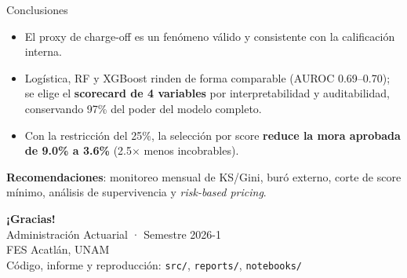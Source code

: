 \documentclass[aspectratio=169, 11pt]{beamer}
\newcommand{\bt}[1]{\textbf{#1}}
\begin{document}
\begin{frame}{Conclusiones}
  \begin{itemize}
    \item El proxy de charge-off es un fenómeno válido y consistente con la
          calificación interna.
    \item Logística, RF y XGBoost rinden de forma comparable (AUROC 0.69--0.70);
          se elige el \bt{scorecard de 4 variables} por interpretabilidad y
          auditabilidad, conservando 97\% del poder del modelo completo.
    \item Con la restricción del 25\%, la selección por score \bt{reduce la
          mora aprobada de 9.0\% a 3.6\%} (2.5$\times$ menos incobrables).
  \end{itemize}

  \vspace{0.5em}
  \bt{Recomendaciones}: monitoreo mensual de KS/Gini, buró externo,
  corte de score mínimo, análisis de supervivencia y \emph{risk-based
  pricing}.
\end{frame}

\begin{frame}[plain]
  \centering
  \vspace{1.5cm}
  {\Large\bfseries\color{azulunam} ¡Gracias!}\\[0.8cm]
  {\large Administración Actuarial · Semestre 2026-1}\\[0.3cm]
  FES Acatlán, UNAM\\[1cm]
  Código, informe y reproducción: \texttt{src/}, \texttt{reports/},
  \texttt{notebooks/}
\end{frame}
\end{document}
